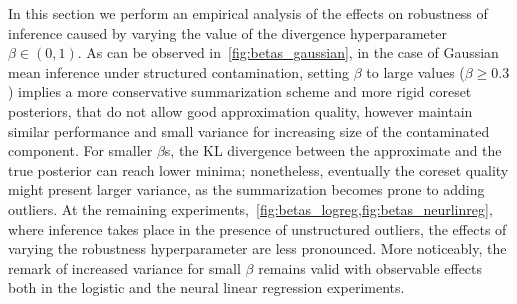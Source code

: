 In this section we perform an empirical analysis of the effects on robustness of inference caused by varying the value of the divergence hyperparameter $\beta \in (0,1)$. As can be observed in~\cref{fig:betas_gaussian}, in the case of Gaussian mean inference under structured contamination, setting $\beta$ to large values ($\beta \geq 0.3$) implies a more conservative summarization scheme and more rigid coreset posteriors, that do not allow good approximation quality, however maintain similar performance and small variance for increasing size of the contaminated component. For smaller $\beta$s, the KL divergence between the approximate and the true posterior can reach lower minima; nonetheless, eventually the coreset quality might present larger variance, as the summarization becomes prone to adding outliers. At the remaining experiments,~\cref{fig:betas_logreg,fig:betas_neurlinreg}, where inference takes place in the presence of unstructured outliers, the effects of varying the robustness hyperparameter are less pronounced. More noticeably, the remark of increased variance for small $\beta$ remains valid with observable effects both in the logistic and the neural linear regression experiments.


